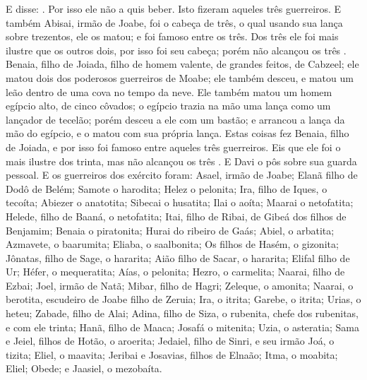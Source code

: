 {  E disse: . Por isso ele não a quis beber. Isto fizeram aqueles três guerreiros.
  E também Abisai, irmão de Joabe, foi o cabeça de três, o qual usando sua lança sobre trezentos, ele os matou; e foi famoso entre os três.
  Dos três ele foi mais ilustre que os outros dois, por isso foi seu cabeça; porém não alcançou os três {}.
   Benaia, filho de Joiada, filho de homem valente, de grandes feitos, de Cabzeel; ele matou dois dos poderosos guerreiros de Moabe; ele também desceu, e matou um leão dentro de uma cova no tempo da neve.
  Ele também matou um homem egípcio alto, de cinco côvados; o egípcio trazia na mão uma lança como um lançador de tecelão; porém {} desceu a ele com um bastão; e arrancou a lança da mão do egípcio, e o matou com sua própria lança.
  Estas coisas fez Benaia, filho de Joiada, e por isso foi famoso entre aqueles três guerreiros.
  Eis que ele foi o mais ilustre dos trinta, mas não alcançou os três {}. E Davi o pôs sobre sua guarda pessoal.
  E os guerreiros dos exército foram: Asael, irmão de Joabe; Elanã filho de Dodô de Belém;
  Samote o harodita; Helez o pelonita;
  Ira, filho de Iques, o tecoíta; Abiezer o anatotita;
  Sibecai o husatita; Ilai o aoíta;
  Maarai o netofatita; Helede, filho de Baaná, o netofatita;
  Itai, filho de Ribai, de Gibeá dos filhos de Benjamim; Benaia o piratonita;
  Hurai do ribeiro de Gaás; Abiel, o arbatita;
  Azmavete, o baarumita; Eliaba, o saalbonita;
  Os filhos de Hasém, o gizonita; Jônatas, filho de Sage, o hararita;
  Aião filho de Sacar, o hararita; Elifal filho de Ur;
  Héfer, o mequeratita; Aías, o pelonita;
  Hezro, o carmelita; Naarai, filho de Ezbai;
  Joel, irmão de Natã; Mibar, filho de Hagri;
  Zeleque, o amonita; Naarai, o berotita, escudeiro de Joabe filho de Zeruia;
  Ira, o itrita; Garebe, o itrita;
  Urias, o heteu; Zabade, filho de Alai;
  Adina, filho de Siza, o rubenita,
{} chefe dos rubenitas, e com ele trinta;
  Hanã, filho de Maaca; Josafá o mitenita;
  Uzia, o asteratia; Sama e Jeiel, filhos de Hotão, o aroerita;
  Jedaiel, filho de Sinri, e seu irmão Joá, o tizita;
  Eliel, o maavita; Jeribai e Josavias, filhos de Elnaão; Itma, o moabita;
  Eliel; Obede; e Jaasiel, o mezobaíta.
\par }

